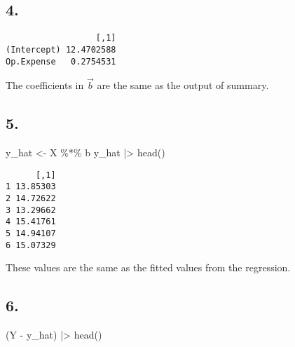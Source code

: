 \documentclass[
  letterpaper,
  DIV=11,
  numbers=noendperiod]{scrartcl}
\newenvironment{Shaded}{\begin{snugshade}}{\end{snugshade}}
\newcommand{\FunctionTok}[1]{\textcolor[rgb]{0.28,0.35,0.67}{#1}}
\newcommand{\NormalTok}[1]{\textcolor[rgb]{0.00,0.23,0.31}{#1}}
\newcommand{\OtherTok}[1]{\textcolor[rgb]{0.00,0.23,0.31}{#1}}
\newcommand{\SpecialCharTok}[1]{\textcolor[rgb]{0.37,0.37,0.37}{#1}}
\begin{document}
\hypertarget{section-6}{%
\subsection{4.}\label{section-6}}

\begin{Shaded}
\end{Shaded}

\begin{verbatim}
                  [,1]
(Intercept) 12.4702588
Op.Expense   0.2754531
\end{verbatim}

The coefficients in \(\vec{b}\) are the same as the output of summary.

\hypertarget{section-7}{%
\subsection{5.}\label{section-7}}

\begin{Shaded}
\begin{Highlighting}[]
\NormalTok{y\_hat }\OtherTok{\textless{}{-}}\NormalTok{ X }\SpecialCharTok{\%*\%}\NormalTok{ b}
\NormalTok{y\_hat }\SpecialCharTok{|\textgreater{}} \FunctionTok{head}\NormalTok{()}
\end{Highlighting}
\end{Shaded}

\begin{verbatim}
      [,1]
1 13.85303
2 14.72622
3 13.29662
4 15.41761
5 14.94107
6 15.07329
\end{verbatim}

These values are the same as the fitted values from the regression.

\hypertarget{section-8}{%
\subsection{6.}\label{section-8}}

\begin{Shaded}
\begin{Highlighting}[]
\NormalTok{(Y }\SpecialCharTok{{-}}\NormalTok{ y\_hat) }\SpecialCharTok{|\textgreater{}} \FunctionTok{head}\NormalTok{()}
\end{Highlighting}
\end{Shaded}
\end{document}
